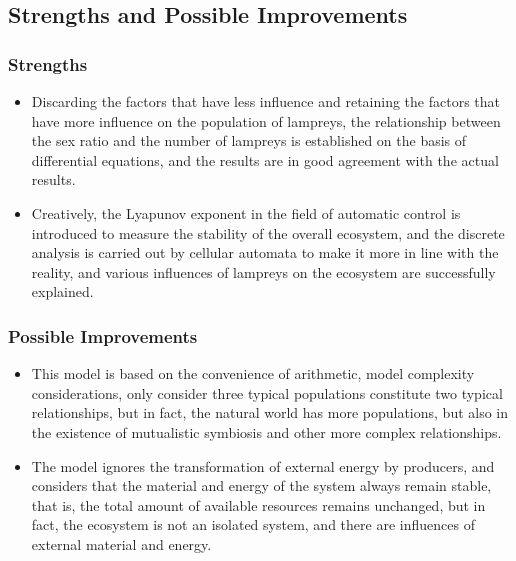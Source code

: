 \documentclass[12pt]{article}  %
\begin{document}
\subsection{Strengths and Possible Improvements}

\subsubsection{Strengths}
\begin{itemize}
	\item Discarding the factors that have less influence and retaining the factors that have more influence on the population of lampreys, the relationship between the sex ratio and the number of lampreys is established on the basis of differential equations, and the results are in good agreement with the actual results.
	\item Creatively, the Lyapunov exponent in the field of automatic control is introduced to measure the stability of the overall ecosystem, and the discrete analysis is carried out by cellular automata to make it more in line with the reality, and various influences of lampreys on the ecosystem are successfully explained.
\end{itemize}

\subsubsection{Possible Improvements}


\begin{itemize}
	\item This model is based on the convenience of arithmetic, model complexity considerations, only consider three typical populations constitute two typical relationships, but in fact, the natural world has more populations, but also in the existence of mutualistic symbiosis and other more complex relationships.
	\item The model ignores the transformation of external energy by producers, and considers that the material and energy of the system always remain stable, that is, the total amount of available resources remains unchanged, but in fact, the ecosystem is not an isolated system, and there are influences of external material and energy.
\end{itemize}
\end{document}
